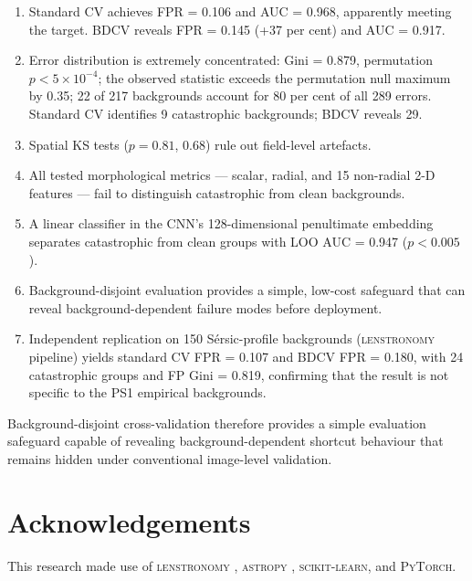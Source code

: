 \documentclass[fleqn,usenatbib]{mnras}
\begin{document}
\begin{enumerate}
\item Standard CV achieves FPR = 0.106 and AUC = 0.968, apparently
meeting the target. BDCV reveals FPR = 0.145 (+37 per cent) and AUC =
0.917.

\item Error distribution is extremely concentrated: Gini = 0.879,
permutation $p < 5\times10^{-4}$; the observed statistic exceeds the
permutation null maximum by 0.35; 22 of 217 backgrounds account for 80
per cent of all 289 errors. Standard CV identifies 9 catastrophic
backgrounds; BDCV reveals 29.

\item Spatial KS tests ($p = 0.81$, 0.68) rule out field-level
artefacts.

\item All tested morphological metrics --- scalar, radial, and 15
non-radial 2-D features --- fail to distinguish catastrophic from clean
backgrounds.

\item A linear classifier in the CNN's 128-dimensional penultimate
embedding separates catastrophic from clean groups with LOO AUC = 0.947
($p < 0.005$).

\item Background-disjoint evaluation provides a simple, low-cost
safeguard that can reveal background-dependent failure modes before
deployment.

\item Independent replication on 150 S\'{e}rsic-profile backgrounds
(\textsc{lenstronomy} pipeline) yields standard CV FPR = 0.107 and BDCV
FPR = 0.180, with 24 catastrophic groups and FP Gini = 0.819, confirming
that the result is not specific to the PS1 empirical backgrounds.
\end{enumerate}

Background-disjoint cross-validation therefore provides a simple
evaluation safeguard capable of revealing background-dependent shortcut
behaviour that remains hidden under conventional image-level validation.

\section*{Acknowledgements}

This research made use of \textsc{lenstronomy} \citep{birrer2018},
\textsc{astropy} \citep{astropy2013}, \textsc{scikit-learn}, and
\textsc{PyTorch}.
\end{document}
